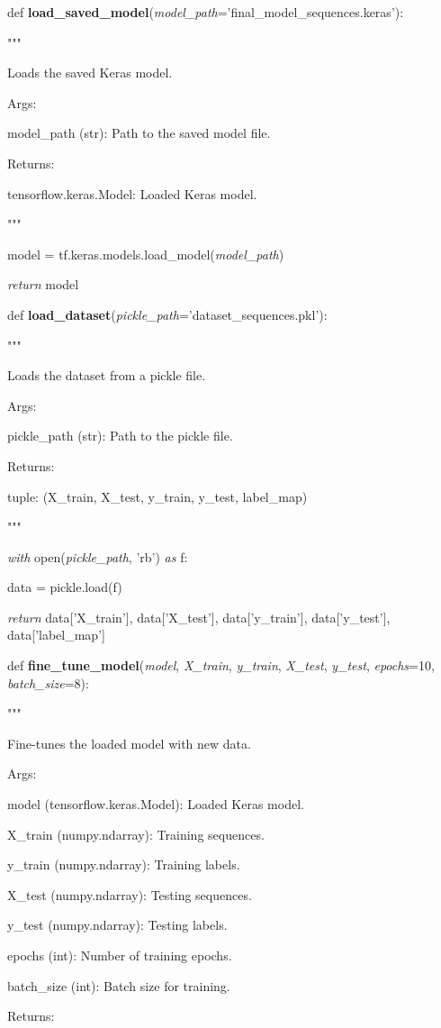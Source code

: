 \documentclass[
]{article}
\begin{document}
def \textbf{load\_saved\_model}(\emph{model\_path}='final\_model\_sequences.keras'):

"""

Loads the saved Keras model.

Args:

model\_path (str): Path to the saved model file.

Returns:

tensorflow.keras.Model: Loaded Keras model.

"""

model = tf.keras.models.load\_model(\emph{model\_path})

\emph{return} model

def \textbf{load\_dataset}(\emph{pickle\_path}='dataset\_sequences.pkl'):

"""

Loads the dataset from a pickle file.

Args:

pickle\_path (str): Path to the pickle file.

Returns:

tuple: (X\_train, X\_test, y\_train, y\_test, label\_map)

"""

\emph{with} open(\emph{pickle\_path}, 'rb') \emph{as} f:

data = pickle.load(f)

\emph{return} data{[}'X\_train'{]}, data{[}'X\_test'{]}, data{[}'y\_train'{]}, data{[}'y\_test'{]}, data{[}'label\_map'{]}

def \textbf{fine\_tune\_model}(\emph{model}, \emph{X\_train}, \emph{y\_train}, \emph{X\_test}, \emph{y\_test}, \emph{epochs}=10, \emph{batch\_size}=8):

"""

Fine-tunes the loaded model with new data.

Args:

model (tensorflow.keras.Model): Loaded Keras model.

X\_train (numpy.ndarray): Training sequences.

y\_train (numpy.ndarray): Training labels.

X\_test (numpy.ndarray): Testing sequences.

y\_test (numpy.ndarray): Testing labels.

epochs (int): Number of training epochs.

batch\_size (int): Batch size for training.

Returns:
\end{document}

